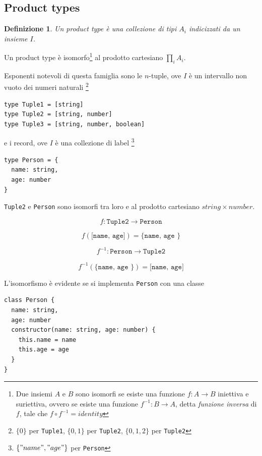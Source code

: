 \documentclass[12pt]{article}
\newtheorem{definition}{Definizione}
\begin{document}
\subsection{Product types}

\begin{definition}
Un product type è una collezione di tipi $A_i$ indicizzati da un insieme $I$.
\end{definition}

Un product type è isomorfo\footnote{Due insiemi $A$ e $B$ sono isomorfi se esiste una funzione $f: A \rightarrow B$ iniettiva e suriettiva,
ovvero se esiste una funzione $f^{-1}: B \rightarrow A$, detta \emph{funzione inversa} di $f$, tale che $f \circ f^{-1} = identity$}
al prodotto cartesiano $\prod_i A_i$.

Esponenti notevoli di questa famiglia sono le $n$-tuple, ove $I$ è un intervallo non vuoto dei numeri naturali
\footnote{$\{0\}$ per \texttt{Tuple1}, $\{0, 1\}$ per \texttt{Tuple2}, $\{0, 1, 2\}$ per \texttt{Tuple2}}

\begin{verbatim}
type Tuple1 = [string]
type Tuple2 = [string, number]
type Tuple3 = [string, number, boolean]
\end{verbatim}

e i record, ove $I$ è una collezione di label
\footnote{$\{ "name", "age" \}$ per \texttt{Person}}

\begin{verbatim}
type Person = {
  name: string,
  age: number
}
\end{verbatim}

\texttt{Tuple2} e \texttt{Person} sono isomorfi tra loro e al prodotto cartesiano $string \times number$.

$$
f: \texttt{Tuple2} \rightarrow \texttt{Person}
$$

$$
f(\texttt{[name, age]}) = \texttt{\{ name, age  \}}
$$

$$
f^{-1}: \texttt{Person} \rightarrow \texttt{Tuple2}
$$

$$
f^{-1}(\texttt{\{ name, age  \}}) = \texttt{[name, age]}
$$

L'isomorfismo è evidente se si implementa \texttt{Person} con una classe

\begin{verbatim}
class Person {
  name: string,
  age: number
  constructor(name: string, age: number) {
    this.name = name
    this.age = age
  }
}
\end{verbatim}
\end{document}
